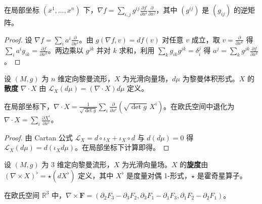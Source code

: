 \begin{proposition}[梯度的坐标公式]\label{prop:gradient_coordinate}
在局部坐标 $(x^1,\dots,x^n)$ 下，$\nabla f=\sum_{i,j}g^{ij}\frac{\partial f}{\partial x^i}\frac{\partial}{\partial x^j}$，其中 $(g^{ij})$ 是 $(g_{ij})$ 的逆矩阵。
\end{proposition}

\begin{proof}
设 $\nabla f=\sum_i a^i\frac{\partial}{\partial x^i}$。由 $g(\nabla f,v)=df(v)$ 对任意 $v$ 成立，取 $v=\frac{\partial}{\partial x^k}$ 得 $\sum_i a^i g_{ik}=\frac{\partial f}{\partial x^k}$。两边乘以 $g^{jk}$ 并对 $k$ 求和，利用 $\sum_k g_{ik}g^{jk}=\delta_i^j$ 得 $a^j=\sum_k g^{jk}\frac{\partial f}{\partial x^k}$。
\end{proof}

\begin{definition}[散度——内蕴定义]\label{def:divergence_intrinsic}
设 $(M,g)$ 为 $n$ 维定向黎曼流形，$X$ 为光滑向量场，$d\mu$ 为黎曼体积形式。$X$ 的\textbf{散度} $\nabla\cdot X$ 由 $\mathcal{L}_X(d\mu)=(\nabla\cdot X)d\mu$ 定义。
\end{definition}

\begin{proposition}[散度的坐标公式]\label{prop:divergence_coordinate}
在局部坐标下，$\nabla\cdot X=\frac{1}{\sqrt{\det g}}\sum_i\frac{\partial}{\partial x^i}(\sqrt{\det g}\,X^i)$。在欧氏空间中退化为 $\nabla\cdot X=\sum_i\frac{\partial X^i}{\partial x^i}$。
\end{proposition}

\begin{proof}
由 Cartan 公式 $\mathcal{L}_X=d\circ\iota_X+\iota_X\circ d$ 与 $d(d\mu)=0$ 得 $\mathcal{L}_X(d\mu)=d(\iota_X d\mu)$。在局部坐标下计算即得。
\end{proof}

\begin{definition}[旋度——内蕴定义]\label{def:curl_intrinsic}
设 $(M,g)$ 为 $3$ 维定向黎曼流形，$X$ 为光滑向量场。$X$ 的\textbf{旋度}由 $(\nabla\times X)^\flat=\star(dX^\flat)$ 定义，其中 $X^\flat$ 是度量对偶 1-形式，$\star$ 是霍奇星算子。
\end{definition}

\begin{proposition}[旋度的坐标公式]\label{prop:curl_coordinate}
在欧氏空间 $\mathbb{R}^3$ 中，$\nabla\times\mathbf{F}=(\partial_2F_3-\partial_3F_2,\partial_3F_1-\partial_1F_3,\partial_1F_2-\partial_2F_1)$。
\end{proposition}


